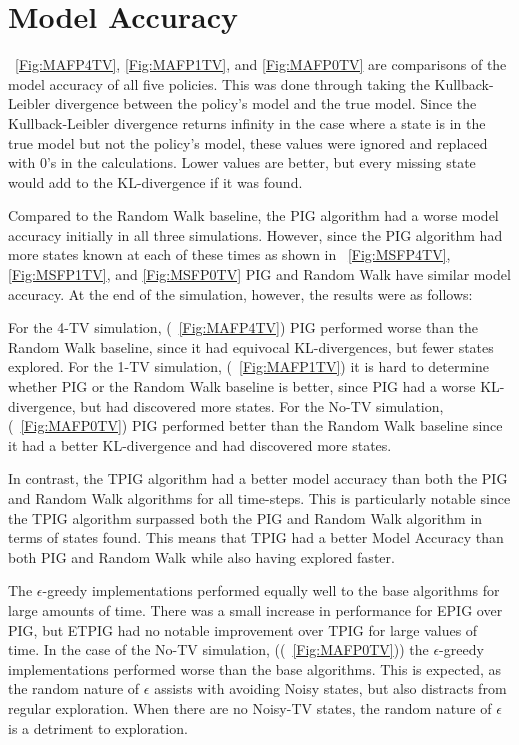 \documentclass[12pt]{thesis}
\begin{document}
\section{Model Accuracy}
\figurename~\ref{Fig:MAFP4TV}, \ref{Fig:MAFP1TV}, and \ref{Fig:MAFP0TV} are comparisons of the model accuracy of all five policies. This was done through taking the Kullback-Leibler divergence between the policy's model and the true model. Since the Kullback-Leibler divergence returns infinity in the case where a state is in the true model but not the policy's model, these values were ignored and replaced with 0's in the calculations. Lower values are better, but every missing state would add to the KL-divergence if it was found.

Compared to the Random Walk baseline, the PIG algorithm had a worse model accuracy initially in all three simulations. However, since the PIG algorithm had more states known at each of these times as shown in \figurename~\ref{Fig:MSFP4TV}, \ref{Fig:MSFP1TV}, and \ref{Fig:MSFP0TV} PIG and Random Walk have similar model accuracy. At the end of the simulation, however, the results were as follows:

For the 4-TV simulation, (\figurename~\ref{Fig:MAFP4TV}) PIG performed worse than the Random Walk baseline, since it had equivocal KL-divergences, but fewer states explored. For the 1-TV simulation, (\figurename~\ref{Fig:MAFP1TV}) it is hard to determine whether PIG or the Random Walk baseline is better, since PIG had a worse KL-divergence, but had discovered more states. For the No-TV simulation, (\figurename~\ref{Fig:MAFP0TV}) PIG performed better than the Random Walk baseline since it had a better KL-divergence and had discovered more states.

In contrast, the TPIG algorithm had a better model accuracy than both the PIG and Random Walk algorithms for all time-steps. This is particularly notable since the TPIG algorithm surpassed both the PIG and Random Walk algorithm in terms of states found. This means that TPIG had a better Model Accuracy than both PIG and Random Walk while also having explored faster.

The $\epsilon$-greedy implementations performed equally well to the base algorithms for large amounts of time. There was a small increase in performance for EPIG over PIG, but ETPIG had no notable improvement over TPIG for large values of time. In the case of the No-TV simulation, ((\figurename~\ref{Fig:MAFP0TV})) the $\epsilon$-greedy implementations performed worse than the base algorithms. This is expected, as the random nature of $\epsilon$ assists with avoiding Noisy states, but also distracts from regular exploration. When there are no Noisy-TV states, the random nature of $\epsilon$ is a detriment to exploration.
\end{document}
